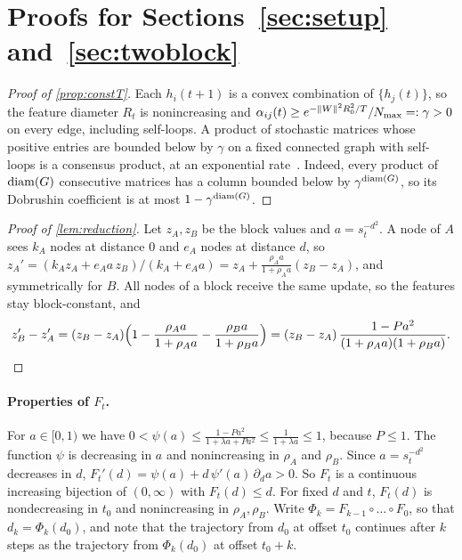 
\section{Proofs for Sections~\ref{sec:setup} and~\ref{sec:twoblock}}\label{app:twoblock}

\begin{proof}[Proof of \cref{prop:constT}]
Each $h_i(t+1)$ is a convex combination of $\{h_j(t)\}$, so the feature diameter $R_t$ is nonincreasing and
$\alpha_{ij}(t)\ge e^{-\|W\|^2R_0^2/T}/N_{\max}=:\gamma>0$ on every edge, including self-loops. A product of stochastic matrices whose
positive entries are bounded below by $\gamma$ on a fixed connected graph with self-loops is a consensus product, at an exponential
rate~\citep{moreau2005}. Indeed, every product of $\operatorname{diam}(G)$ consecutive matrices has a column bounded below by $\gamma^{\operatorname{diam}(G)}$, so its
Dobrushin coefficient is at most $1-\gamma^{\operatorname{diam}(G)}$.
\end{proof}

\begin{proof}[Proof of \cref{lem:reduction}]
Let $z_A,z_B$ be the block values and $a=s_t^{-d^2}$. A node of $A$ sees $k_A$ nodes at distance $0$ and $e_A$ nodes at distance $d$, so
$z_A'=(k_Az_A+e_Aa\,z_B)/(k_A+e_Aa)=z_A+\frac{\rho_Aa}{1+\rho_Aa}(z_B-z_A)$, and symmetrically for $B$. All nodes of a block receive the same
update, so the features stay block-constant, and
\[
z_B'-z_A'=(z_B-z_A)\Big(1-\frac{\rho_Aa}{1+\rho_Aa}-\frac{\rho_Ba}{1+\rho_Ba}\Big)=(z_B-z_A)\,\frac{1-Pa^2}{(1+\rho_Aa)(1+\rho_Ba)} .\qedhere
\]
\end{proof}

\paragraph{Properties of $F_t$.} For $a\in[0,1)$ we have $0<\psi(a)\le\frac{1-Pa^2}{1+\lambda a+Pa^2}\le\frac1{1+\lambda a}\le1$, because
$P\le1$. The function $\psi$ is decreasing in $a$ and nonincreasing in $\rho_A$ and $\rho_B$. Since $a=s_t^{-d^2}$ decreases in $d$,
$F_t'(d)=\psi(a)+d\,\psi'(a)\,\partial_da>0$. So $F_t$ is a continuous increasing bijection of $(0,\infty)$ with $F_t(d)\le d$. For fixed $d$
and $t$, $F_t(d)$ is nondecreasing in $t_0$ and nonincreasing in $\rho_A,\rho_B$. Write $\Phi_k=F_{k-1}\circ\dots\circ F_0$, so that
$d_k=\Phi_k(d_0)$, and note that the trajectory from $d_0$ at offset $t_0$ continues after $k$ steps as the trajectory from $\Phi_k(d_0)$
at offset $t_0+k$.

